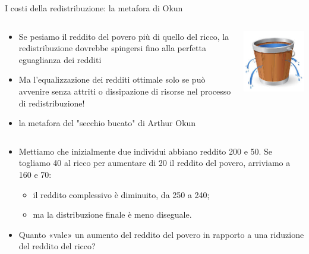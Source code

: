 \documentclass[aspectratio=64,11pt]{beamer}
\begin{document}
\begin{frame}{I costi della redistribuzione: la metafora di Okun}
\begin{columns}
\begin{column}{.75\columnwidth}
\begin{itemize}
\item Se pesiamo il reddito del povero più di quello del ricco, la
redistribuzione dovrebbe spingersi fino alla perfetta eguaglianza dei redditi
\item Ma l'equalizzazione dei redditi ottimale solo se può avvenire senza attriti
o dissipazione di risorse nel processo di redistribuzione!
\item la metafora del "secchio bucato" di Arthur Okun
\end{itemize}
\end{column}
\begin{column}{.25\columnwidth}
\begin{center}
\includegraphics[width=.9\linewidth]{./figure/leaky-bucket.jpeg}
\end{center}
\end{column}
\end{columns}
\vspace{6mm} 
\begin{itemize}
\item Mettiamo che inizialmente due individui abbiano reddito 200 e 50.  Se
togliamo 40 al ricco per aumentare di 20 il reddito del povero, arriviamo a
160 e 70:
\begin{itemize}
\item il reddito complessivo è diminuito, da 250 a 240;
\item ma la distribuzione finale è meno diseguale.
\end{itemize}
\item Quanto «vale» un aumento del reddito del povero in rapporto a una riduzione
del reddito del ricco?
\end{itemize}
\end{frame}
\end{document}
